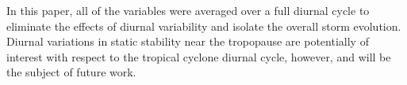 \documentclass{ametsoc}
\begin{document}

In this paper, all of the variables were averaged over a full diurnal cycle to eliminate the effects of diurnal variability and isolate the overall storm evolution.
Diurnal variations in static stability near the tropopause are potentially of interest with respect to the tropical cyclone diurnal cycle, however, and will be the subject of future work.







\end{document}
